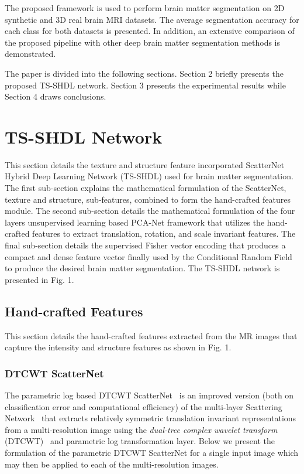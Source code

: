 \documentclass[10pt,twocolumn,letterpaper]{article}
\begin{document}
The proposed framework is used to perform brain matter segmentation on 2D synthetic and 3D real brain MRI datasets. The average segmentation accuracy for each class for both datasets is presented. In addition, an extensive comparison of the proposed pipeline with other deep brain matter segmentation methods is demonstrated.

The paper is divided into the following sections. Section 2 briefly presents the proposed TS-SHDL network. Section 3 presents the experimental results while Section 4 draws conclusions.

\section{TS-SHDL Network}
This section details the texture and structure feature incorporated ScatterNet Hybrid Deep Learning Network (TS-SHDL) used for brain matter segmentation. The first sub-section explains the mathematical formulation of the ScatterNet, texture and structure, sub-features, combined to form the hand-crafted features module. The second sub-section details the mathematical formulation of the four layers unsupervised learning based PCA-Net framework that utilizes the hand-crafted features to extract translation, rotation, and scale invariant features. The final sub-section details the supervised Fisher vector encoding that produces a compact and dense feature vector finally used by the Conditional Random Field to produce the desired brain matter segmentation. The TS-SHDL network is presented in Fig. 1.

\subsection{Hand-crafted Features}
This section details the hand-crafted features extracted from the MR images that capture the intensity and structure features as shown in Fig. 1.

\subsubsection{DTCWT ScatterNet}
The parametric log based DTCWT ScatterNet~\cite{singh2017dual} is an improved version (both on classification error and computational efficiency) of the multi-layer Scattering Network~\cite{Jbruna2013,Oyallon2015,ima,eccv} that extracts relatively symmetric translation invariant representations from a multi-resolution image using the \textit{dual-tree complex wavelet transform} (DTCWT)~\cite{Kingsbury1998} and parametric log transformation layer. Below we present the formulation of the parametric DTCWT ScatterNet for a single input image which may then be applied to each of the multi-resolution images.
\end{document}
